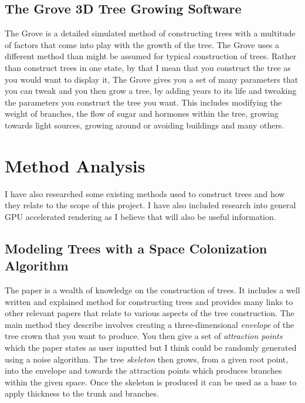 \documentclass[proposal]{cmpreport}
\begin{document}
\subsection{The Grove 3D Tree Growing Software}
The Grove \cite{thegrove} is a detailed simulated method of constructing trees with a 
multitude of factors that come into play with the growth of the tree. The Grove uses a 
different method than might be assumed for typical construction of trees. Rather than 
construct trees in one state, by that I mean that you construct the tree as you would 
want to display it, The Grove gives you a set of many parameters that you can tweak and 
you then grow a tree, by adding years to its life and tweaking the parameters you 
construct the tree you want. This includes modifying the weight of branches, the flow 
of sugar and hormones within the tree, growing towards light sources, growing around 
or avoiding buildings and many others.

\pagebreak
\section{Method Analysis}
I have also researched some existing methods used to construct trees and how they 
relate to the scope of this project. I have also included research into general 
GPU accelerated rendering as I believe that will also be useful information.

\subsection{Modeling Trees with a Space Colonization Algorithm}
The paper \cite{colonization} is a wealth of knowledge on the construction of trees. 
It includes a well written and explained method for constructing trees and provides 
many links to other relevant papers that relate to various aspects of the tree 
construction. The main method they describe involves creating a three-dimensional 
\textit{envelope} of the tree crown that you want to produce. You then give a set of 
\textit{attraction points} which the paper states as user inputted but I think could be 
randomly generated using a noise algorithm. The tree \textit{skeleton} then grows, from a 
given root point, into the envelope and towards the attraction points which produces 
branches within the given space. Once the skeleton is produced it can be used as a 
base to apply thickness to the trunk and branches.
\end{document}

